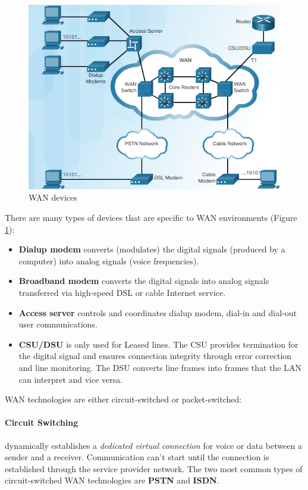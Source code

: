 \begin{figure}[hbtp]
\caption{WAN devices}\label{Device}
\centering
\includegraphics[scale=1]{pictures/Device.PNG}
\end{figure}

There are many types of devices that are specific to WAN environments (Figure \ref{Device}):

\begin{itemize}
\item \textbf{Dialup modem} converts (modulates) the digital signals (produced by a computer) into analog signals (voice frequencies).

\item \textbf{Broadband modem} converts the digital signals into analog signals transferred via high-speed DSL or cable Internet service.

\item \textbf{Access server} controls and coordinates dialup modem, dial-in and dial-out user communications.


\item \textbf{CSU/DSU} is only used for Leased lines. The CSU provides termination for the digital signal and ensures connection integrity through error correction and line monitoring. The DSU converts line frames into frames that the LAN can interpret and vice versa.
\end{itemize}

WAN technologies are either circuit-switched or packet-switched:

\paragraph{Circuit Switching} dynamically establishes a \emph{dedicated virtual connection} for voice or data between a sender and a receiver. Communication can't start until the connection is established through the service provider network. The two most common types of circuit-switched WAN technologies are \textbf{PSTN} and \textbf{ISDN}.

